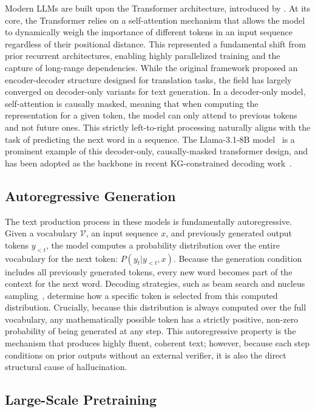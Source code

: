 Modern LLMs are built upon the Transformer architecture, introduced by \citet{vaswani2017attention}. At its core, the Transformer relies on a self-attention mechanism that allows the model to dynamically weigh the importance of different tokens in an input sequence regardless of their positional distance. This represented a fundamental shift from prior recurrent architectures, enabling highly parallelized training and the capture of long-range dependencies. While the original framework proposed an encoder-decoder structure designed for translation tasks, the field has largely converged on decoder-only variants for text generation. In a decoder-only model, self-attention is causally masked, meaning that when computing the representation for a given token, the model can only attend to previous tokens and not future ones. This strictly left-to-right processing naturally aligns with the task of predicting the next word in a sequence. The Llama-3.1-8B model~\citep{dubey2024llama3} is a prominent example of this decoder-only, causally-masked transformer design, and has been adopted as the backbone in recent KG-constrained decoding work~\citep{luo2024gcr}.

\subsection{Autoregressive Generation}

The text production process in these models is fundamentally autoregressive. Given a vocabulary $\mathcal{V}$, an input sequence $x$, and previously generated output tokens $y_{<t}$, the model computes a probability distribution over the entire vocabulary for the next token: $P(y_t | y_{<t}, x)$. Because the generation condition includes all previously generated tokens, every new word becomes part of the context for the next word. Decoding strategies, such as beam search and nucleus sampling~\citep{holtzman2020curious}, determine how a specific token is selected from this computed distribution. Crucially, because this distribution is always computed over the full vocabulary, any mathematically possible token has a strictly positive, non-zero probability of being generated at any step. This autoregressive property is the mechanism that produces highly fluent, coherent text; however, because each step conditions on prior outputs without an external verifier, it is also the direct structural cause of hallucination.



\subsection{Large-Scale Pretraining}

